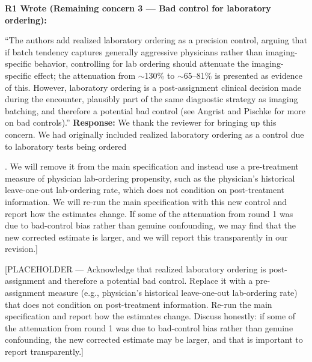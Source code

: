 \documentclass[11pt]{article}
\newenvironment{quote2}
{ \bigskip
\noindent
         \small\em
         \baselineskip=14pt
}
\newcommand{\1}{\hbox{\rm 1\kern-.35em 1}}
\begin{document}
\begin{quote2}
\textbf{R1 Wrote (Remaining concern 3 --- Bad control for laboratory ordering):}

\noindent ``The authors add realized laboratory ordering as a precision control, arguing that if batch tendency captures generally aggressive physicians rather than imaging-specific behavior, controlling for lab ordering should attenuate the imaging-specific effect; the attenuation from $\sim$130\% to $\sim$65--81\% is presented as evidence of this. However, laboratory ordering is a post-assignment clinical decision made during the encounter, plausibly part of the same diagnostic strategy as imaging batching, and therefore a potential bad control (see Angrist and Pischke for more on bad controls).''
\end{quote2}

\noindent\textbf{Response:} \color{blue} We thank the reviewer for bringing up this concern. We had originally included realized laboratory ordering as a control due to laboratory tests being ordered

. We will remove it from the main specification and instead use a pre-treatment measure of physician lab-ordering propensity, such as the physician's historical leave-one-out lab-ordering rate, which does not condition on post-treatment information. We will re-run the main specification with this new control and report how the estimates change. If some of the attenuation from round 1 was due to bad-control bias rather than genuine confounding, we may find that the new corrected estimate is larger, and we will report this transparently in our revision.]



[PLACEHOLDER --- Acknowledge that realized laboratory ordering is post-assignment and therefore a potential bad control. Replace it with a pre-assignment measure (e.g., physician's historical leave-one-out lab-ordering rate) that does not condition on post-treatment information. Re-run the main specification and report how the estimates change. Discuss honestly: if some of the attenuation from round 1 was due to bad-control bias rather than genuine confounding, the new corrected estimate may be larger, and that is important to report transparently.]
\color{black}

\clearpage

\end{document}
